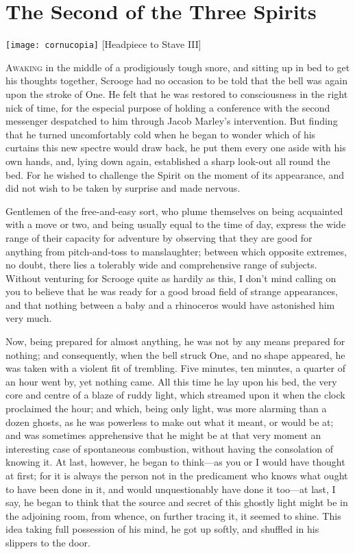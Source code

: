 \chapter{The Second of the Three Spirits}
	
\begin{minipage}[c]{\textwidth}
\texttt{[image: cornucopia]}
[Headpiece to Stave III]{}
\end{minipage}
\vfill

\lettrine[lines=4]{A}{waking} in the middle of a prodigiously tough snore, and sitting up in bed to get his thoughts together, Scrooge had no occasion to be told that the bell was again upon the stroke of One. He felt that he was restored to consciousness in the right nick of time, for the especial purpose of holding a conference with the second messenger despatched to him through Jacob Marley's intervention. But finding that he turned uncomfortably cold when he began to wonder which of his curtains this new spectre would draw back, he put them every one aside with his own hands, and, lying down again, established a sharp look-out all round the bed. For he wished to challenge the Spirit on the moment of its appearance, and did not wish to be taken by surprise and made nervous.

Gentlemen of the free-and-easy sort, who plume themselves on being acquainted with a move or two, and being usually equal to the time of day, express the wide range of their capacity for adventure by observing that they are good for anything from pitch-and-toss to manslaughter; between which opposite extremes, no doubt, there lies a tolerably wide and comprehensive range of subjects. Without venturing for Scrooge quite as hardily as this, I don't mind calling on you to believe that he was ready for a good broad field of strange appearances, and that nothing between a baby and a rhinoceros would have astonished him very much.

Now, being prepared for almost anything, he was not by any means prepared for nothing; and consequently, when the bell  struck One, and no shape appeared, he was taken with a violent fit of trembling. Five minutes, ten minutes, a quarter of an hour went by, yet nothing came. All this time he lay upon his bed, the very core and centre of a blaze of ruddy light, which streamed upon it when the clock proclaimed the hour; and which, being only light, was more alarming than a dozen ghosts, as he was powerless to make out what it meant, or would be at; and was sometimes apprehensive that he might be at that very moment an interesting case of spontaneous combustion, without having the consolation of knowing it. At last, however, he began to think—as you or I would have thought at first; for it is always the person not in the predicament who knows what ought to have been done in it, and would unquestionably have done it too—at last, I say, he began to think that the source and secret of this ghostly light might be in the adjoining room, from whence, on further tracing it, it seemed to shine. This idea taking full possession of his mind, he got up softly, and shuffled in his slippers to the door.

